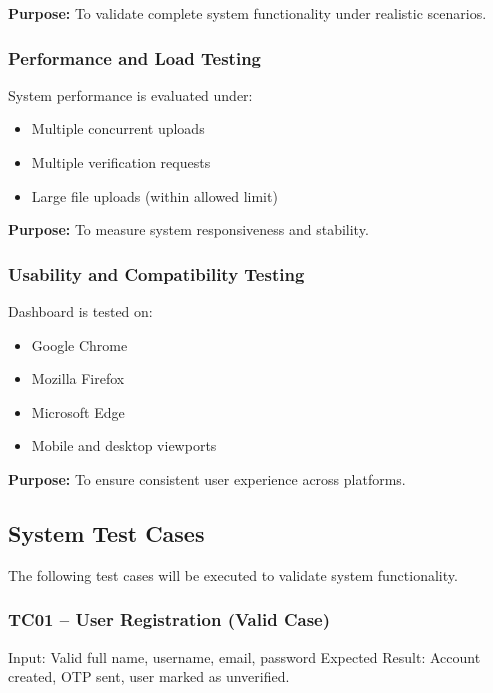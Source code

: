 \documentclass[12pt]{article}
\begin{document}
\textbf{Purpose:}  
To validate complete system functionality under realistic scenarios.

\subsubsection{Performance and Load Testing}

System performance is evaluated under:

\begin{itemize}
\item Multiple concurrent uploads
\item Multiple verification requests
\item Large file uploads (within allowed limit)
\end{itemize}

\textbf{Purpose:}  
To measure system responsiveness and stability.

\subsubsection{Usability and Compatibility Testing}

Dashboard is tested on:

\begin{itemize}
\item Google Chrome
\item Mozilla Firefox
\item Microsoft Edge
\item Mobile and desktop viewports
\end{itemize}

\textbf{Purpose:}  
To ensure consistent user experience across platforms.

\subsection{System Test Cases}

The following test cases will be executed to validate system functionality.



\subsubsection{TC01 -- User Registration (Valid Case)} 
Input: Valid full name, username, email, password \newline
Expected Result: Account created, OTP sent, user marked as unverified.
\end{document}
